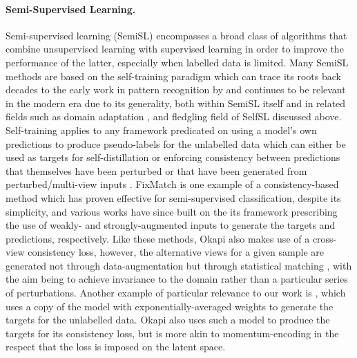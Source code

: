 \paragraph{Semi-Supervised Learning.}  
%
Semi-supervised learning (SemiSL) encompasses a broad class of algorithms that combine unsupervised
learning with supervised learning in order to improve the performance of the latter, especially
when labelled data is limited.
%
Many \ac{SemiSL} methods are based on the self-training paradigm which can trace its roots back
decades to the early work in pattern recognition by \citet{scudder1965probability} and continues to
be relevant in the modern era due to its generality, both within \ac{SemiSL} itself and in related
fields such as domain adaptation \citep{ganin2016domain}, and fledgling field of \ac{SelfSL}
\citep{caron2021emerging} discussed above.
%
Self-training applies to any framework predicated on using a model's own predictions to produce
pseudo-labels for the unlabelled data which can either be used as targets for self-distillation
\citep{xie2020self} or enforcing consistency between predictions that themselves have been
perturbed \citep{bachman2014learning, xie2020self} or that have been generated from
perturbed/multi-view inputs \citep{sohn2020fixmatch}.
%
FixMatch \citep{sohn2020fixmatch} is one example of a consistency-based method which has proven
effective for semi-supervised classification, despite its simplicity, and various works
\citep{gong2021alphamatch, lienen2021credal} have since built on the its framework prescribing the
use of weakly- and strongly-augmented inputs to generate the targets and predictions, respectively.
%
Like these methods, Okapi also makes use of a cross-view consistency loss, however, the alternative
views for a given sample are generated not through data-augmentation but through statistical
matching \citep{rosenbaum1983central}, with the aim being to achieve invariance to the domain
rather than a particular series of perturbations.
%
Another example of particular relevance to our work is \citet{tarvainen2017mean}, which uses a copy
of the model with exponentially-averaged weights to generate the targets for the unlabelled data.
Okapi also uses such a model to produce the targets for its consistency loss, but is more akin to
momentum-encoding \citep{he2020momentum} in the respect that the loss is imposed on the latent
space.

